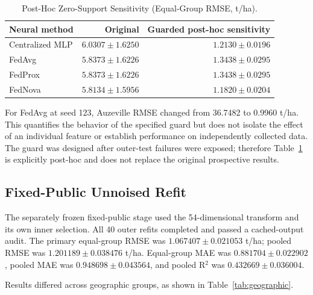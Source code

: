 \documentclass[journal]{IEEEtran}
\begin{document}
\begin{table}[htbp]
\caption{Post-Hoc Zero-Support Sensitivity (Equal-Group RMSE, t/ha).}
\label{tab:posthoc}
\centering
\begin{tabular}{lrr}
\toprule
Neural method & Original & Guarded post-hoc sensitivity \\
\midrule
Centralized MLP & $6.0307 \pm 1.6250$ & $1.2130 \pm 0.0196$ \\
FedAvg          & $5.8373 \pm 1.6226$ & $1.3438 \pm 0.0295$ \\
FedProx         & $5.8373 \pm 1.6226$ & $1.3438 \pm 0.0295$ \\
FedNova         & $5.8134 \pm 1.5956$ & $1.1820 \pm 0.0204$ \\
\bottomrule
\end{tabular}
\end{table}

For FedAvg at seed 123, Auzeville RMSE changed from 36.7482 to 0.9960 t/ha.
This quantifies the behavior of the specified guard but does not isolate the
effect of an individual feature or establish performance on independently
collected data. The guard was designed after outer-test failures were exposed;
therefore Table~\ref{tab:posthoc} is explicitly post-hoc and does not replace
the original prospective results.

\subsection{Fixed-Public Unnoised Refit}

The separately frozen fixed-public stage used the 54-dimensional transform and
its own inner selection. All 40 outer refits completed and passed a
cached-output audit. The primary equal-group RMSE was
$1.067407 \pm 0.021053$ t/ha; pooled RMSE was $1.201189 \pm 0.038476$ t/ha.
Equal-group MAE was $0.881704 \pm 0.022902$, pooled MAE was
$0.948698 \pm 0.043564$, and pooled R$^2$ was $0.432669 \pm 0.036004$.

Results differed across geographic groups, as shown in
Table~\ref{tab:geographic}.
\end{document}
